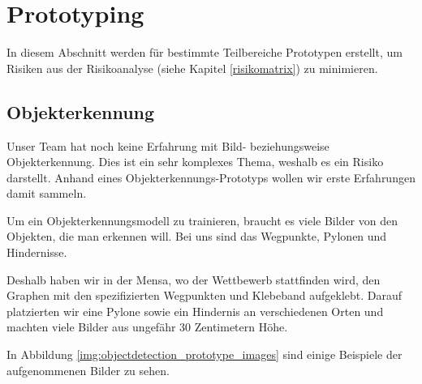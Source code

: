 \documentclass[../main.tex]{subfiles}
\begin{document}
\newpage
\section{Prototyping}

In diesem Abschnitt werden für bestimmte Teilbereiche Prototypen erstellt,  
um Risiken aus der Risikoanalyse (siehe Kapitel \ref{risikomatrix}) zu minimieren.

\subsection{Objekterkennung}

Unser Team hat noch keine Erfahrung mit Bild- beziehungsweise Objekterkennung.  
Dies ist ein sehr komplexes Thema, weshalb es ein Risiko darstellt.  
Anhand eines Objekterkennungs-Prototyps wollen wir erste Erfahrungen damit sammeln.

Um ein Objekterkennungsmodell zu trainieren, braucht es viele Bilder von den Objekten, die man erkennen will. Bei uns sind das Wegpunkte, Pylonen und Hindernisse.

Deshalb haben wir in der Mensa, wo der Wettbewerb stattfinden wird, den Graphen mit den spezifizierten Wegpunkten und Klebeband aufgeklebt. Darauf platzierten wir eine Pylone sowie ein Hindernis an verschiedenen Orten und machten viele Bilder aus ungefähr 30 Zentimetern Höhe.

In Abbildung \ref{img:objectdetection_prototype_images} sind einige Beispiele der aufgenommenen Bilder zu sehen.
\end{document}
